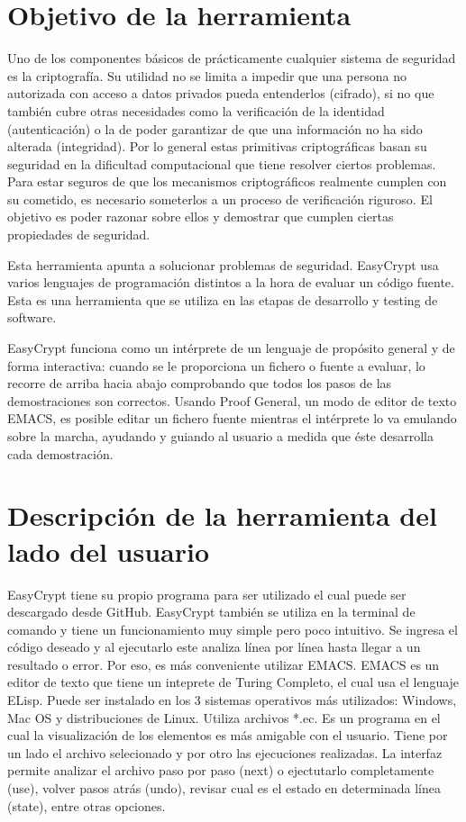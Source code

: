 \documentclass[runningheads,a4paper]{llncs}
\begin{document}
\section{Objetivo de la herramienta} 
Uno de los componentes básicos de prácticamente cualquier sistema de seguridad es la criptografía. Su utilidad no se limita a impedir que una persona no autorizada con acceso a datos privados pueda entenderlos (cifrado), si no que también cubre otras necesidades como la verificación de la identidad (autenticación) o la de poder garantizar de que una información no ha sido alterada (integridad). Por lo general estas primitivas criptográficas basan su seguridad en la dificultad computacional que tiene resolver ciertos problemas. Para estar seguros de que los mecanismos criptográficos realmente cumplen con su cometido, es necesario someterlos a un proceso de verificación riguroso. El objetivo es poder razonar sobre ellos y demostrar que cumplen ciertas propiedades de seguridad. 

Esta herramienta apunta a solucionar problemas de seguridad. EasyCrypt usa varios lenguajes de programación distintos a la hora de evaluar un código fuente. Esta es una herramienta que se utiliza en las etapas de desarrollo y testing de software. 

EasyCrypt funciona como un intérprete de un lenguaje de propósito general y de forma interactiva: cuando se le proporciona un fichero o fuente a evaluar, lo recorre de arriba hacia abajo comprobando que todos los pasos de las demostraciones son correctos. Usando Proof General, un modo de editor de texto EMACS, es posible editar un fichero fuente mientras el intérprete lo va emulando sobre la marcha, ayudando y guiando al usuario a medida que éste desarrolla cada demostración. 

\section{Descripción de la herramienta del lado del usuario}

EasyCrypt tiene su propio programa para ser utilizado el cual puede ser descargado desde GitHub.\cite{link1}
EasyCrypt también se utiliza en la terminal de comando y tiene un funcionamiento muy simple pero poco intuitivo. Se ingresa el código deseado y al ejecutarlo este analiza línea por línea hasta llegar a un resultado o error. Por eso, es más conveniente utilizar EMACS\cite{link2}. EMACS es un editor de texto que tiene un inteprete de Turing Completo, el cual usa el lenguaje ELisp. Puede ser instalado en los 3 sistemas operativos más utilizados: Windows, Mac OS y distribuciones de Linux. Utiliza archivos *.ec. Es un programa en el cual la visualización de los elementos es más amigable con el usuario. Tiene por un lado el archivo selecionado y por otro las ejecuciones realizadas. La interfaz permite analizar el archivo paso por paso (next) o ejectutarlo completamente (use), volver pasos atrás (undo), revisar cual es el estado en determinada línea (state), entre otras opciones.
\end{document}
